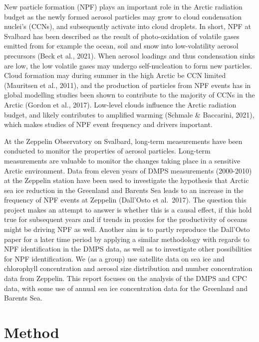 \documentclass[11pt]{article}
\begin{document}
New particle formation (NPF) plays an important role in the Arctic
radiation budget as the newly formed aerosol particles may grow to cloud
condensation nuclei's (CCNs), and subsequently activate into cloud
droplets. In short, NPF at Svalbard has been described as the result of
photo-oxidation of volatile gases emitted from for example the ocean,
soil and snow into low-volatility aerosol precursors (Beck et al.,
2021). When aerosol loadings and thus condensation sinks are low, the
low volatile gases may undergo self-nucleation to form new particles.
Cloud formation may during summer in the high Arctic be CCN limited
(Mauritsen et al., 2011), and the production of particles from NPF
events has in global modelling studies been shown to contribute to the
majority of CCNs in the Arctic (Gordon et al., 2017). Low-level clouds
influence the Arctic radiation budget, and likely contributes to
amplified warming (Schmale \& Baccarini, 2021), which makes studies of
NPF event frequency and drivers important.

At the Zeppelin Observatory on Svalbard, long-term measurements have
been conducted to monitor the properties of aerosol particles. Long-term
measurements are valuable to monitor the changes taking place in a
sensitive Arctic environment. Data from eleven years of DMPS
measurements (2000-2010) at the Zeppelin station have been used to
investigate the hypothesis that Arctic sea ice reduction in the
Greenland and Barents Sea leads to an increase in the frequency of NPF
events at Zeppelin (Dall'Osto et al.~2017). The question this project
makes an attempt to answer is whether this is a causal effect, if this
hold true for subsequent years and if trends in proxies for the
productivity of oceans might be driving NPF as well. Another aim is to
partly reproduce the Dall'Osto paper for a later time period by applying
a similar methodology with regards to NPF identification in the DMPS
data, as well as to investigate other possibilities for NPF
identification. We (as a group) use satellite data on sea ice and
chlorophyll concentration and aerosol size distribution and number
concentration data from Zeppelin. This report focuses on the analysis of
the DMPS and CPC data, with some use of annual sea ice concentration
data for the Greenland and Barents Sea.

    \hypertarget{method}{%
\section{Method}\label{method}}
\end{document}
